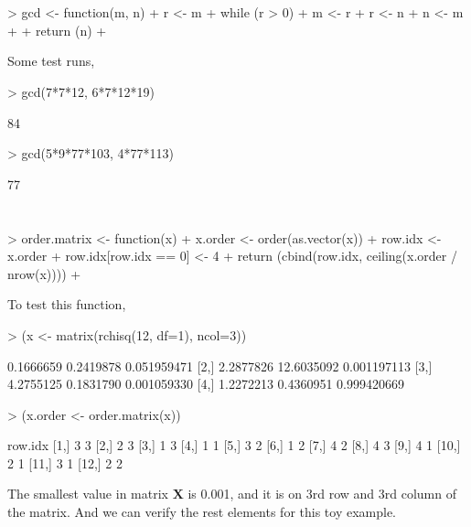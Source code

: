 \documentclass{article}
\begin{document}
\section{}
\begin{Schunk}
\begin{Sinput}
> gcd <- function(m, n){
+     r <- m %% n
+     while (r > 0){
+         m <- r
+         r <- n %% r
+         n <- m
+     }
+     return (n)
+ }
\end{Sinput}
\end{Schunk}
Some test runs,
\begin{Schunk}
\begin{Sinput}
> gcd(7*7*12, 6*7*12*19)
\end{Sinput}
\begin{Soutput}
[1] 84
\end{Soutput}
\begin{Sinput}
> gcd(5*9*77*103, 4*77*113)
\end{Sinput}
\begin{Soutput}
[1] 77
\end{Soutput}
\end{Schunk}
\section{}
\begin{Schunk}
\begin{Sinput}
> order.matrix <- function(x){
+     x.order <- order(as.vector(x))
+     row.idx <- x.order %% nrow(x)
+     row.idx[row.idx == 0] <- 4
+     return (cbind(row.idx, ceiling(x.order / nrow(x))))
+ }
\end{Sinput}
\end{Schunk}
To test this function,
\begin{Schunk}
\begin{Sinput}
> (x <- matrix(rchisq(12, df=1), ncol=3))
\end{Sinput}
\begin{Soutput}
          [,1]       [,2]        [,3]
[1,] 0.1666659  0.2419878 0.051959471
[2,] 2.2877826 12.6035092 0.001197113
[3,] 4.2755125  0.1831790 0.001059330
[4,] 1.2272213  0.4360951 0.999420669
\end{Soutput}
\begin{Sinput}
> (x.order <- order.matrix(x))
\end{Sinput}
\begin{Soutput}
      row.idx  
 [1,]       3 3
 [2,]       2 3
 [3,]       1 3
 [4,]       1 1
 [5,]       3 2
 [6,]       1 2
 [7,]       4 2
 [8,]       4 3
 [9,]       4 1
[10,]       2 1
[11,]       3 1
[12,]       2 2
\end{Soutput}
\end{Schunk}
The smallest value in matrix $\mathbf{X}$ is 0.001, and it is on 3rd row and 3rd column of the matrix. And we can verify the rest elements for this toy example. 
\end{document}
